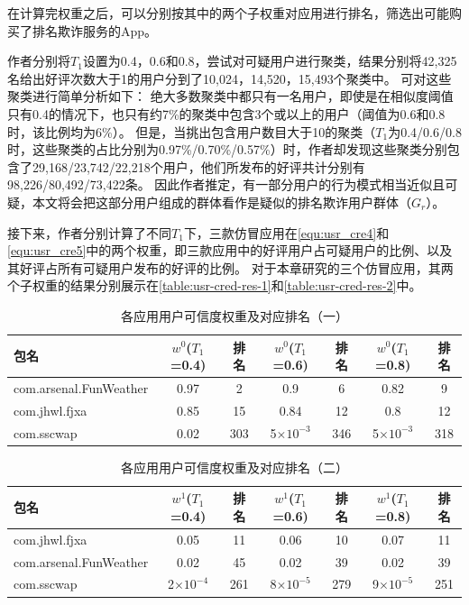 在计算完权重之后，可以分别按其中的两个子权重对应用进行排名，筛选出可能购买了排名欺诈服务的App。

作者分别将$T_1$设置为0.4，0.6和0.8，尝试对可疑用户进行聚类，结果分别将42,325名给出好评次数大于1的用户分到了10,024，14,520，15,493个聚类中。
可对这些聚类进行简单分析如下：
绝大多数聚类中都只有一名用户，即使是在相似度阈值只有0.4的情况下，也只有约7\%的聚类中包含3个或以上的用户（阈值为0.6和0.8时，该比例均为6\%）。
但是，当挑出包含用户数目大于10的聚类（$T_1$为0.4/0.6/0.8时，这些聚类的占比分别为0.97\%/0.70\%/0.57\%）时，作者却发现这些聚类分别包含了29,168/23,742/22,218个用户，他们所发布的好评共计分别有98,226/80,492/73,422条。
因此作者推定，有一部分用户的行为模式相当近似且可疑，本文将会把这部分用户组成的群体看作是疑似的排名欺诈用户群体（$G_r$）。

接下来，作者分别计算了不同$T_1$下，三款仿冒应用在\autoref{equ:usr_cre4}和\autoref{equ:usr_cre5}中的两个权重，即三款应用中的好评用户占可疑用户的比例、以及其好评占所有可疑用户发布的好评的比例。
对于本章研究的三个仿冒应用，其两个子权重的结果分别展示在\autoref{table:usr-cred-res-1}和\autoref{table:usr-cred-res-2}中。

\begin{table}[htbp]
	\renewcommand{\arraystretch}{1}
	\small
	\centering
	\caption{各应用用户可信度权重及对应排名（一）}
	\vspace{1mm}
	\begin{tabular}{lcccccc}
		\toprule
		包名 & $w^0$($T_1$=0.4) & 排名 & $w^0$($T_1$=0.6) & 排名 & $w^0$($T_1$=0.8) & 排名 \\
		\midrule
		com.arsenal.FunWeather & 0.97 & 2 & 0.9 & 6 & 0.82 & 9 \\
		\rowcolor{gray!15} com.jhwl.fjxa & 0.85 & 15 & 0.84 & 12 & 0.8 & 12 \\
		com.sscwap & 0.02 & 303 & 5$\times10^{-3}$ & 346 & 5$\times10^{-3}$ & 318 \\
		\bottomrule
	\end{tabular}
	\label{table:usr-cred-res-1}
\end{table}

\begin{table}[htbp]
	\renewcommand{\arraystretch}{1}
	\small
	\centering
	\caption{各应用用户可信度权重及对应排名（二）}
	\vspace{1mm}
	\begin{tabular}{lcccccc}
		\toprule
		包名 & $w^1$($T_1$=0.4) & 排名 & $w^1$($T_1$=0.6) & 排名 & $w^1$($T_1$=0.8) & 排名 \\
		\midrule
		com.jhwl.fjxa & 0.05 & 11 & 0.06 & 10 & 0.07 & 11 \\
		\rowcolor{gray!15} com.arsenal.FunWeather & 0.02 & 45 & 0.02 & 39 & 0.02 & 39 \\
		com.sscwap & 2$\times10^{-4}$ & 261 & 8$\times10^{-5}$ & 279 & 9$\times10^{-5}$ & 251 \\
		\bottomrule
	\end{tabular}
	\label{table:usr-cred-res-2}
\end{table}

